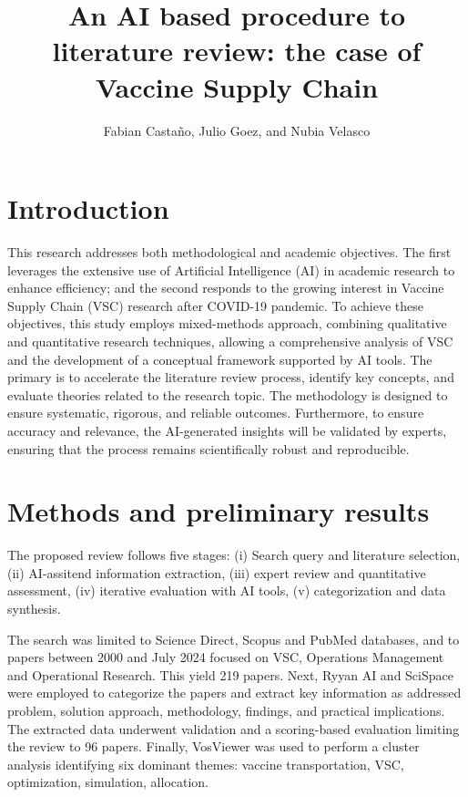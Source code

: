 \documentclass{optica-article}
\begin{document}
\title{An AI based procedure to literature review: the case of Vaccine Supply Chain}

\author{Fabian Castaño, Julio Goez, and Nubia Velasco}
\address{ Applied Intelligence Team, Mercado Libre\\ NHH, Norwegian School of Economics, Department of Business and Management Science\\ School of Management, Universidad de los Andes.}

\section{Introduction}

This research addresses both methodological and academic objectives. The first leverages the extensive use of Artificial Intelligence (AI) in academic research to enhance efficiency; and the second responds to the growing interest in Vaccine Supply Chain (VSC) research after COVID-19 pandemic. To achieve these objectives, this study employs mixed-methods approach, combining qualitative and quantitative research techniques, allowing a comprehensive analysis of VSC and the development of a conceptual framework supported by AI tools. The primary is to accelerate the literature review process, identify key concepts, and evaluate theories related to the research topic. The methodology is designed to ensure systematic, rigorous, and reliable outcomes. Furthermore, to ensure accuracy and relevance, the AI-generated insights will be validated by experts, ensuring that the process remains scientifically robust and reproducible.

\section{Methods and preliminary results}

The proposed review follows five stages: (i) Search query and literature selection, (ii) AI-assitend information extraction, (iii) expert review and quantitative assessment, (iv) iterative evaluation with AI tools, (v) categorization and data synthesis.

The search was limited to Science Direct, Scopus and PubMed databases, and to papers between 2000 and July 2024 focused on VSC, Operations Management and Operational Research. This yield 219 papers. Next, Ryyan AI and SciSpace were employed to categorize the papers and extract key information as addressed problem, solution approach, methodology, findings, and practical implications. The extracted data underwent validation and a scoring-based evaluation limiting the review to 96 papers. Finally, VosViewer was used to perform a cluster analysis identifying six dominant themes: vaccine transportation, VSC, optimization, simulation, allocation.
\end{document}
